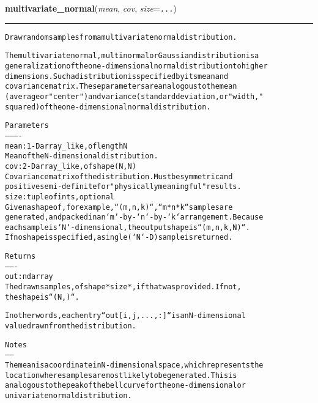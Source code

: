     \label{QSTK:qstklearn:mldiagnostics:multivariate_normal}

    \vspace{0.5ex}

\hspace{.8\funcindent}\begin{boxedminipage}{\funcwidth}

    \raggedright \textbf{multivariate\_normal}(\textit{mean}, \textit{cov}, \textit{size}={\tt ...})

    \vspace{-1.5ex}

    \rule{\textwidth}{0.5\fboxrule}
\setlength{\parskip}{2ex}
\begin{alltt}
Draw random samples from a multivariate normal distribution.

The multivariate normal, multinormal or Gaussian distribution is a
generalization of the one-dimensional normal distribution to higher
dimensions.  Such a distribution is specified by its mean and
covariance matrix.  These parameters are analogous to the mean
(average or "center") and variance (standard deviation, or "width,"
squared) of the one-dimensional normal distribution.

Parameters
----------
mean : 1-D array\_like, of length N
    Mean of the N-dimensional distribution.
cov : 2-D array\_like, of shape (N, N)
    Covariance matrix of the distribution.  Must be symmetric and
    positive semi-definite for "physically meaningful" results.
size : tuple of ints, optional
    Given a shape of, for example, ``(m,n,k)``, ``m*n*k`` samples are
    generated, and packed in an `m`-by-`n`-by-`k` arrangement.  Because
    each sample is `N`-dimensional, the output shape is ``(m,n,k,N)``.
    If no shape is specified, a single (`N`-D) sample is returned.

Returns
-------
out : ndarray
    The drawn samples, of shape *size*, if that was provided.  If not,
    the shape is ``(N,)``.

    In other words, each entry ``out[i,j,...,:]`` is an N-dimensional
    value drawn from the distribution.

Notes
-----
The mean is a coordinate in N-dimensional space, which represents the
location where samples are most likely to be generated.  This is
analogous to the peak of the bell curve for the one-dimensional or
univariate normal distribution.


\end{alltt}
\end{boxedminipage}
